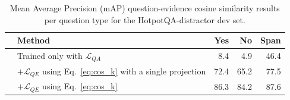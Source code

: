 \begin{table}[t]
\centering
\footnotesize
\setlength{\tabcolsep}{3pt} 
        \begin{tabular}[b]{@{}clrrr@{}}
            \toprule
            &Method            & Yes & No & Span \\ \midrule
            &Trained only with $\mathcal{L}_{QA}$ & 8.4   & 4.9    & 46.4     \\ 
            & $+\mathcal{L}_{QE}$ using Eq.~\ref{eq:cos_k} with a single projection & 72.4 & 65.2 & 77.5\\
            &$+\mathcal{L}_{QE}$ using Eq.~\ref{eq:cos_k} & 86.3 & 84.2 & 87.6\\
            \bottomrule
        \end{tabular}
\caption{Mean Average Precision (mAP) question-evidence cosine similarity results per question type for the HotpotQA-distractor dev set.} 
\label{tab:map}
\end{table}
